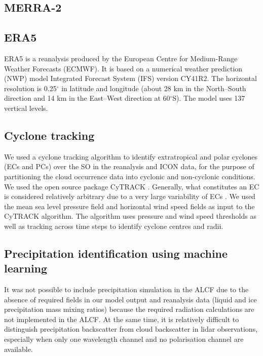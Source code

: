 \documentclass[12pt,a4paper]{article}
\begin{document}

\subsection{MERRA-2}

\subsection{ERA5}

ERA5 \citep{era5} is a reanalysis produced by the European Centre for
Medium-Range Weather Forecasts (ECMWF). It is based on a numerical weather
prediction (NWP) model Integrated Forecast System (IFS) version CY41R2.  The
horizontal resolution is 0.25$^\circ$ in latitude and longitude (about 28 km in
the North--South direction and 14 km in the East--West direction at
60$^\circ$S). The model uses 137 vertical levels.

\subsection{Cyclone tracking}

We used a cyclone tracking algorithm to identify extratropical and polar
cyclones (ECs and PCs) over the SO in the reanalysis and ICON data,
for the purpose of partitioning the cloud occurrence data into cyclonic and
non-cyclonic conditions. We used the open source package CyTRACK
\citep{perez-alarcon2024}. Generally, what constitutes an EC is considered
relatively arbitrary due to a very large variability of ECs \citep{neu2013}.
We used the mean sea level pressure field and horizontal wind speed fields
as input to the CyTRACK algorithm. The algorithm uses pressure and wind
speed thresholds as well as tracking across time steps to identify cyclone
centres and radii.

\subsection{Precipitation identification using machine learning}
\label{sec:ann}

It was not possible to include precipitation simulation in the ALCF due to the
absence of required fields in our model output and reanalysis data (liquid and
ice precipitation mass mixing ratios) because the required radiation
calculations are not implemented in the ALCF. At the same time, it is relatively
difficult to distinguish precipitation backscatter from cloud backscatter
in lidar observations, especially when only one wavelength channel and no
polarisation channel are available.
\end{document}
